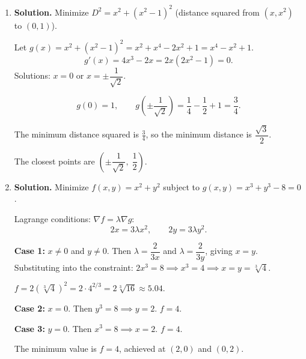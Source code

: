 \begin{enumerate}
By Lagrange multipliers (or by symmetry): a box of minimum surface area with fixed volume is a \textbf{cube}. So $x = y = z = \sqrt[3]{100} = 100^{1/3}$.

\textbf{Verification with Lagrange multipliers:} $\nabla S = \lambda \nabla V$:
\[
2(y+z) = \lambda yz, \quad 2(x+z) = \lambda xz, \quad 2(x+y) = \lambda xy.
\]
From the first two: $\dfrac{2(y+z)}{yz} = \dfrac{2(x+z)}{xz}$, giving $\dfrac{1}{z}+\dfrac{1}{y} = \dfrac{1}{z}+\dfrac{1}{x}$, so $x = y$. Similarly $y = z$.

With $x = y = z$: $x^3 = 100$, so $x = y = z = \boxed{\sqrt[3]{100} \approx 4.642}$ units.

The minimum surface area is $S = 6(\sqrt[3]{100})^2 = 6 \cdot 100^{2/3} \approx 129.3$ square units.

\item \textbf{Solution.}
Minimize $D^2 = x^2 + (x^2 - 1)^2$ (distance squared from $(x, x^2)$ to $(0,1)$).

Let $g(x) = x^2 + (x^2-1)^2 = x^2 + x^4 - 2x^2 + 1 = x^4 - x^2 + 1$.
\[
g'(x) = 4x^3 - 2x = 2x(2x^2-1) = 0.
\]
Solutions: $x = 0$ or $x = \pm\dfrac{1}{\sqrt{2}}$.

\[
g(0) = 1, \qquad g\!\left(\pm\frac{1}{\sqrt{2}}\right) = \frac{1}{4} - \frac{1}{2} + 1 = \frac{3}{4}.
\]

The minimum distance squared is $\frac{3}{4}$, so the minimum distance is $\dfrac{\sqrt{3}}{2}$.

The closest points are $\boxed{\left(\pm\dfrac{1}{\sqrt{2}},\; \dfrac{1}{2}\right)}$.

\item \textbf{Solution.}
Minimize $f(x,y) = x^2 + y^2$ subject to $g(x,y) = x^3 + y^3 - 8 = 0$.

Lagrange conditions: $\nabla f = \lambda \nabla g$:
\[
2x = 3\lambda x^2, \qquad 2y = 3\lambda y^2.
\]

\textbf{Case 1:} $x \neq 0$ and $y \neq 0$. Then $\lambda = \dfrac{2}{3x}$ and $\lambda = \dfrac{2}{3y}$, giving $x = y$. Substituting into the constraint: $2x^3 = 8 \implies x^3 = 4 \implies x = y = \sqrt[3]{4}$.

$f = 2(\sqrt[3]{4})^2 = 2 \cdot 4^{2/3} = 2\sqrt[3]{16} \approx 5.04$.

\textbf{Case 2:} $x = 0$. Then $y^3 = 8 \implies y = 2$. $f = 4$.

\textbf{Case 3:} $y = 0$. Then $x^3 = 8 \implies x = 2$. $f = 4$.

The minimum value is $\boxed{f = 4}$, achieved at $(2,0)$ and $(0,2)$.


\end{enumerate}
